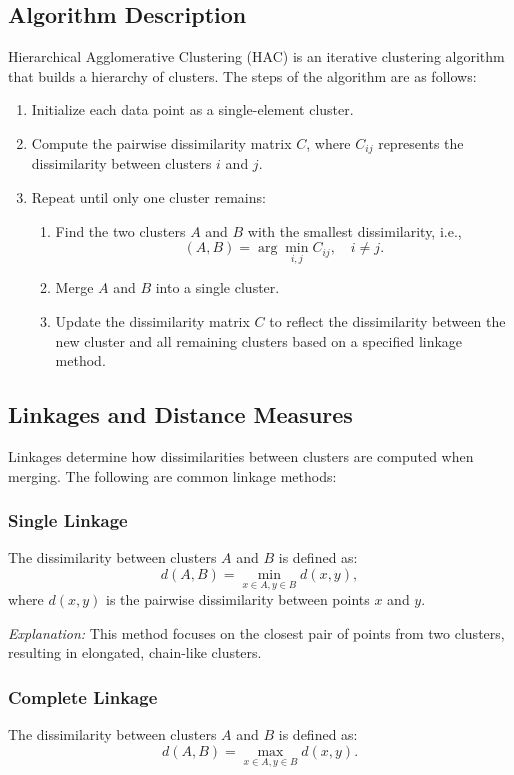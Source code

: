 \documentclass[12pt,a4paper]{article}
\begin{document}
\subsection{Algorithm Description}
Hierarchical Agglomerative Clustering (HAC) is an iterative clustering algorithm that builds a hierarchy of clusters. The steps of the algorithm are as follows:
\begin{enumerate}
    \item Initialize each data point as a single-element cluster.
    \item Compute the pairwise dissimilarity matrix $C$, where $C_{ij}$ represents the dissimilarity between clusters $i$ and $j$.
    \item Repeat until only one cluster remains:
    \begin{enumerate}
        \item Find the two clusters $A$ and $B$ with the smallest dissimilarity, i.e., 
        \[
        (A, B) = \arg \min_{i, j} C_{ij}, \quad i \neq j.
        \]
        \item Merge $A$ and $B$ into a single cluster.
        \item Update the dissimilarity matrix $C$ to reflect the dissimilarity between the new cluster and all remaining clusters based on a specified linkage method.
    \end{enumerate}
\end{enumerate}

\subsection{Linkages and Distance Measures}
Linkages determine how dissimilarities between clusters are computed when merging. The following are common linkage methods:

\subsubsection{Single Linkage}
The dissimilarity between clusters $A$ and $B$ is defined as:
\[
d(A, B) = \min_{x \in A, y \in B} d(x, y),
\]
where $d(x, y)$ is the pairwise dissimilarity between points $x$ and $y$.

\textit{Explanation:} This method focuses on the closest pair of points from two clusters, resulting in elongated, chain-like clusters.

\subsubsection{Complete Linkage}
The dissimilarity between clusters $A$ and $B$ is defined as:
\[
d(A, B) = \max_{x \in A, y \in B} d(x, y).
\]
\end{document}
